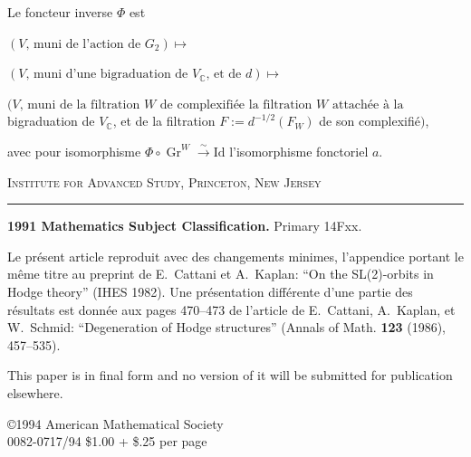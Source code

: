 \documentclass[12pt,a4paper]{article}
\theoremstyle{plain}
\theoremstyle{definition}
\DeclareMathOperator{\Gr}{Gr}
\newcommand{\C}{\mathbb{C}}
\begin{document}
Le foncteur inverse $\Phi$ est

$(V \text{, muni de l'action de } G_2) \mapsto$

$(V \text{, muni d'une bigraduation de } V_\C \text{, et de } d) \mapsto$

$(V \text{, muni de la filtration } W \text{ de complexifi\'{e}e la filtration } W \text{ attach\'{e}e \`{a} la}$
bigraduation de $V_\C$, et de la filtration $F := d^{-1/2}(F_W)$ de son complexifi\'{e}$)$,

avec pour isomorphisme $\Phi \circ \Gr^W \xrightarrow{\sim} \mathrm{Id}$ l'isomorphisme fonctoriel $a$.

\vspace{1cm}

\begin{flushright}
\textsc{Institute for Advanced Study, Princeton, New Jersey}
\end{flushright}

\vfill

\begin{center}
\rule{0.5\textwidth}{0.4pt}
\end{center}

\vspace{0.3cm}

{\small\noindent\textbf{1991 Mathematics Subject Classification.} Primary 14Fxx.}

\vspace{0.2cm}

{\small\noindent Le pr\'{e}sent article reproduit avec des changements minimes, l'appendice portant le m\^{e}me titre
au preprint de E.~Cattani et A.~Kaplan: ``On the SL(2)-orbits in Hodge theory'' (IHES 1982).
Une pr\'{e}sentation diff\'{e}rente d'une partie des r\'{e}sultats est donn\'{e}e aux pages 470--473 de l'article
de E.~Cattani, A.~Kaplan, et W.~Schmid: ``Degeneration of Hodge structures'' (Annals of Math.
\textbf{123} (1986), 457--535).}

\vspace{0.2cm}

{\small\noindent This paper is in final form and no version of it will be submitted for publication elsewhere.}

\vspace{0.2cm}

{\small\noindent \copyright 1994 American Mathematical Society\\
0082-0717/94 \$1.00 + \$.25 per page}
\end{document}
